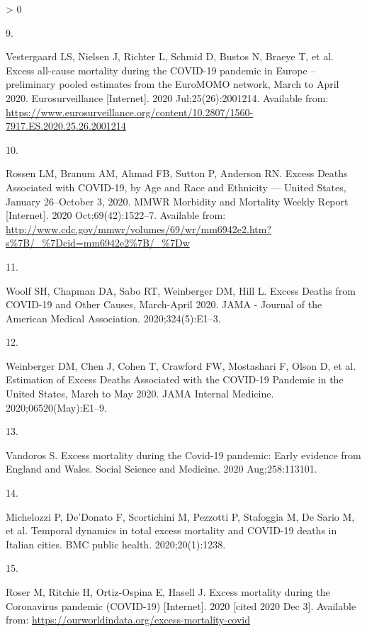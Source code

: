 \documentclass[
]{article}
\newlength{\cslhangindent}
\newlength{\csllabelwidth}
\newenvironment{CSLReferences}[2] %
 {%
  \setlength{\parindent}{0pt}
  \ifodd #1 \everypar{\setlength{\hangindent}{\cslhangindent}}\ignorespaces\fi
  \ifnum #2 > 0
  \setlength{\parskip}{#2\baselineskip}
  \fi
 }%
 {}
\newcommand{\CSLLeftMargin}[1]{\parbox[t]{\csllabelwidth}{#1}}
\newcommand{\CSLRightInline}[1]{\parbox[t]{\linewidth - \csllabelwidth}{#1}\break}
\begin{document}
\begin{CSLReferences}{0}{0}
\leavevmode\hypertarget{ref-Vestegaard2020}{}%
\CSLLeftMargin{9. }
\CSLRightInline{Vestergaard LS, Nielsen J, Richter L, Schmid D, Bustos N, Braeye T, et al. {Excess all-cause mortality during the COVID-19 pandemic in Europe -- preliminary pooled estimates from the EuroMOMO network, March to April 2020}. Eurosurveillance {[}Internet{]}. 2020 Jul;25(26):2001214. Available from: \url{https://www.eurosurveillance.org/content/10.2807/1560-7917.ES.2020.25.26.2001214}}

\leavevmode\hypertarget{ref-Rossen2020}{}%
\CSLLeftMargin{10. }
\CSLRightInline{Rossen LM, Branum AM, Ahmad FB, Sutton P, Anderson RN. {Excess Deaths Associated with COVID-19, by Age and Race and Ethnicity --- United States, January 26--October 3, 2020}. MMWR Morbidity and Mortality Weekly Report {[}Internet{]}. 2020 Oct;69(42):1522--7. Available from: \url{http://www.cdc.gov/mmwr/volumes/69/wr/mm6942e2.htm?s\%7B/_\%7Dcid=mm6942e2\%7B/_\%7Dw}}

\leavevmode\hypertarget{ref-Woolf2020}{}%
\CSLLeftMargin{11. }
\CSLRightInline{Woolf SH, Chapman DA, Sabo RT, Weinberger DM, Hill L. {Excess Deaths from COVID-19 and Other Causes, March-April 2020}. JAMA - Journal of the American Medical Association. 2020;324(5):E1--3. }

\leavevmode\hypertarget{ref-Weinberger2020}{}%
\CSLLeftMargin{12. }
\CSLRightInline{Weinberger DM, Chen J, Cohen T, Crawford FW, Mostashari F, Olson D, et al. {Estimation of Excess Deaths Associated with the COVID-19 Pandemic in the United States, March to May 2020}. JAMA Internal Medicine. 2020;06520(May):E1--9. }

\leavevmode\hypertarget{ref-Vandoros2020}{}%
\CSLLeftMargin{13. }
\CSLRightInline{Vandoros S. {Excess mortality during the Covid-19 pandemic: Early evidence from England and Wales}. Social Science and Medicine. 2020 Aug;258:113101. }

\leavevmode\hypertarget{ref-Michelozzi2020}{}%
\CSLLeftMargin{14. }
\CSLRightInline{Michelozzi P, De'Donato F, Scortichini M, Pezzotti P, Stafoggia M, De Sario M, et al. {Temporal dynamics in total excess mortality and COVID-19 deaths in Italian cities}. BMC public health. 2020;20(1):1238. }

\leavevmode\hypertarget{ref-Roser2020}{}%
\CSLLeftMargin{15. }
\CSLRightInline{Roser M, Ritchie H, Ortiz-Ospina E, Hasell J. {Excess mortality during the Coronavirus pandemic (COVID-19)} {[}Internet{]}. 2020 {[}cited 2020 Dec 3{]}. Available from: \url{https://ourworldindata.org/excess-mortality-covid}}


\end{CSLReferences}
\end{document}
